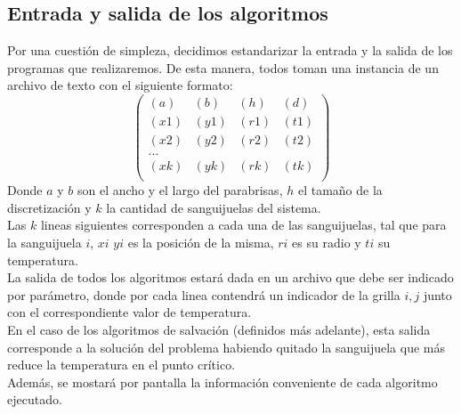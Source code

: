 \newpage
\subsection{Entrada y salida de los algoritmos}

Por una cuestión de simpleza, decidimos estandarizar la entrada y la salida de los programas que realizaremos. De esta manera, todos toman una instancia de un archivo de texto con el siguiente formato:
$$
\begin{pmatrix}
 (a) & (b) & (h) & (d) \\
 (x1) & (y1) & (r1) & (t1) \\
 (x2) & (y2) & (r2) & (t2) \\
...\\
 (xk) & (yk) & (rk) & (tk) \\
\end{pmatrix}
$$
Donde $a$ y $b$ son el ancho y el largo del parabrisas, $h$ el tamaño de la discretización y $k$ la cantidad de sanguijuelas del sistema.
\\
Las $k$ lineas siguientes corresponden a cada una de las sanguijuelas, tal que para la sanguijuela $i$, $xi$ $yi$ es la posición de la misma, $ri$ es su radio y $ti$ su temperatura.
\\
La salida de todos los algoritmos estará dada en un archivo que debe ser indicado por parámetro, donde por cada linea contendrá un indicador de la grilla $i,j$ junto con el correspondiente valor de temperatura.
\\
En el caso de los algoritmos de salvación (definidos más adelante), esta salida corresponde a la solución del problema habiendo quitado la sanguijuela que más reduce la temperatura en el punto crítico.
\\
Además, se mostará por pantalla la información conveniente de cada algoritmo ejecutado.
